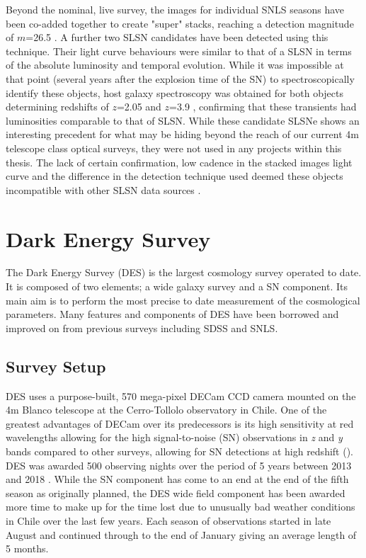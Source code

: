 Beyond the nominal, live survey, the images for individual SNLS seasons have been co-added together to create "super" stacks, reaching a detection magnitude of $m$=26.5 \citep{Cooke2012}. A further two SLSN candidates have been detected using this technique. Their light curve behaviours were similar to that of a SLSN in terms of the absolute luminosity and temporal evolution. While it was impossible at that point (several years after the explosion time of the SN) to spectroscopically identify these objects, host galaxy spectroscopy was obtained for both objects determining redshifts of $z$=2.05 and $z$=3.9 \citep{Cooke2012}, confirming that these transients had luminosities comparable to that of SLSN. While these candidate SLSNe shows an interesting precedent for what may be hiding beyond the reach of our current 4m telescope class optical surveys, they were not used in any projects within this thesis. The lack of certain confirmation, low cadence in the stacked images light curve and the difference in the detection technique used deemed these objects incompatible with other SLSN data sources \citep{Prajs2016}.

\section{Dark Energy Survey}
The Dark Energy Survey (DES) is the largest cosmology survey operated to date. It is composed of two elements; a wide galaxy survey and a SN component. Its main aim is to perform the most precise to date measurement of the cosmological parameters. Many features and components of DES have been borrowed and improved on from previous surveys including SDSS and SNLS.

\subsection{Survey Setup}
DES uses a purpose-built, 570 mega-pixel DECam CCD camera \citep{Honscheid2008,Flaugher2015} mounted on the 4m Blanco telescope at the Cerro-Tollolo observatory in Chile. One of the greatest advantages of DECam over its predecessors is its high sensitivity at red wavelengths allowing for the high signal-to-noise (S\/N) observations in \textit{z} and \textit{y} bands compared to other surveys, allowing for SN detections at high redshift (). DES was awarded 500 observing nights over the period of 5 years between 2013 and 2018 \citep{DES2016}. While the SN component has come to an end at the end of the fifth season as originally planned, the DES wide field component has been awarded more time to make up for the time lost due to unusually bad weather conditions in Chile over the last few years. Each season of observations started in late August and continued through to the end of January giving an average length of 5 months.

